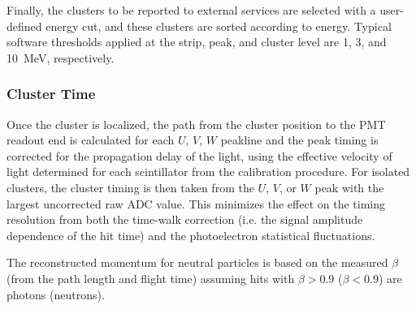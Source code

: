 Finally, the clusters to be reported to external services are selected with a user-defined energy cut, and these
clusters are sorted according to energy. Typical software thresholds applied at the strip, peak, and cluster level
are 1, 3, and 10~MeV, respectively.

\subsubsection {Cluster Time}
\label{ec-time}

Once the cluster is localized, the path from the cluster position to the PMT readout end is calculated for each
$U$, $V$, $W$ peakline and the peak timing is corrected for the propagation delay of the light, using the effective
velocity of light determined for each scintillator from the calibration procedure. For isolated clusters, the cluster
timing is then taken from the $U$, $V$, or $W$ peak with the largest uncorrected raw ADC value. This minimizes
the effect on the timing resolution from both the time-walk correction (i.e. the signal amplitude dependence of the
hit time) and the photoelectron statistical fluctuations.

The reconstructed momentum for neutral particles is based on the measured $\beta$ (from the path length and
flight time) assuming hits with $\beta > 0.9$ ($\beta < 0.9$) are photons (neutrons).
